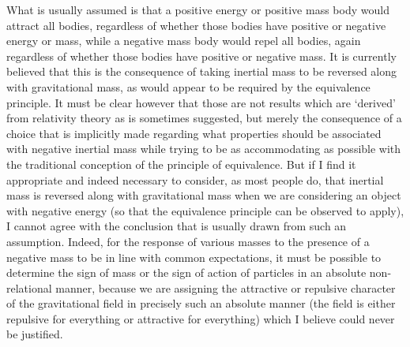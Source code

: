 \documentclass[notitlepage,12pt]{report}
\begin{document}
What is usually assumed is that a positive energy or positive mass body would attract all bodies, regardless of whether those bodies have positive or negative energy or mass, while a negative mass body would repel all bodies, again regardless of whether those bodies have positive or negative mass. It is currently believed that this is the consequence of taking inertial mass to be reversed along with gravitational mass, as would appear to be required by the equivalence principle. It must be clear however that those are not results which are `derived' from relativity theory as is sometimes suggested, but merely the consequence of a choice that is implicitly made regarding what properties should be associated with negative inertial mass while trying to be as accommodating as possible with the traditional conception of the principle of equivalence. But if I find it appropriate and indeed necessary to consider, as most people do, that inertial mass is reversed along with gravitational mass when we are considering an object with negative energy (so that the equivalence principle can be observed to apply), I cannot agree with the conclusion that is usually drawn from such an assumption. Indeed, for the response of various masses to the presence of a negative mass to be in line with common expectations, it must be possible to determine the sign of mass or the sign of action of particles in an absolute non-relational manner, because we are assigning the attractive or repulsive character of the gravitational field in precisely such an absolute manner (the field is either repulsive for everything or attractive for everything) which I believe could never be justified.
\end{document}
